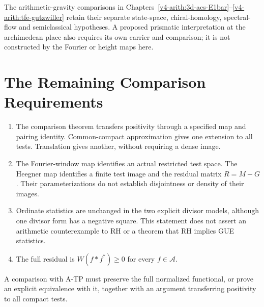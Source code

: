 The arithmetic-gravity comparisons in
Chapters~\ref{v4-arith:3d-acs-E1bar}--\ref{v4-arith:tfe-gutzwiller}
retain their separate state-space, chiral-homology, spectral-flow and
semiclassical hypotheses. A proposed prismatic interpretation at the
archimedean place also requires its own carrier and comparison;
it is not constructed by the Fourier or height maps here.

\section{The Remaining Comparison Requirements}
\label{v4-arith:w8-atp:summary}

\begin{enumerate}
\item The comparison theorem transfers positivity through a
specified map and pairing identity. Common-compact approximation
gives one extension to all tests. Translation gives another, without
requiring a dense image.
\item The Fourier-window map identifies an actual restricted
test space. The Heegner map identifies a finite test image and
the residual matrix $R=M-G$. Their parameterizations do not
establish disjointness or density of their images.
\item Ordinate statistics are unchanged in the two explicit
divisor models, although one divisor form has a negative square.
This statement does not assert an arithmetic counterexample
to RH or a theorem that RH implies GUE statistics.
\item The full residual is
$W(f*f^*)\geq0$ for every $f\in\mathscr A$.
\end{enumerate}

A comparison with A-TP must preserve the full normalized functional,
or prove an explicit equivalence with it, together with an argument
transferring positivity to all compact tests.

